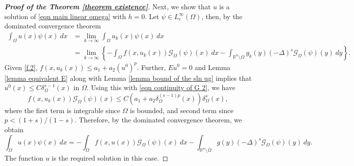 \documentclass{amsart}
\newcommand{\R}{\mathbb{R}}
\newcommand{\slap}{(-\Delta)^{s}}
\newcommand{\g}[1]{\mathcal{G}_{#1}}
\begin{document}
\begin{proof}[\textbf{Proof of the Theorem \ref{theorem existence}}]
    Next, we show that $u$ is a solution of \eqref{eqn main linear omega} with $h=0$.
    Let $\psi\in L^{\infty}_{c}(\Omega)$, then, by the dominated convergence theorem 
    \begin{equation*}
        \begin{split}
            \int_{\Omega}u(x)\psi(x)\ dx
            &=\lim_{k\to \infty}\int_{\Omega}u_{k}(x)\psi(x)\ dx \\
           & =\lim_{k\to\infty}\left\{-\int_{\Omega}f\left(x,u_{k}(x)\right)\g{\Omega}(\psi)(x)\ dx-\int_{\R^{n}\setminus\overline{\Omega}}g_{k}(y) \slap \g{\Omega}(\psi)(y)\ dy\right\}.
        \end{split}
    \end{equation*}
    Given \ref{f.2}, $f(x,u_{k}(x))\leq a_{1}+a_{2}(u^{0})^{p}$. Further, $Eu^{0}=0$ and Lemma \ref{lemma equivalent E} along with Lemma \ref{lemma bound of the sln ug} implies that $u^{0}(x)\leq C \delta_{\Omega}^{s-1}(x)$ in $\Omega$. Using this with \eqref{eqn continuity of G 2}, we have 
    \begin{equation*}
        f(x,u_{k}(x))\g{\Omega}(\psi)(x)\leq C(a_{1}+a_{2}\delta_{\Omega}^{(s-1)p}(x))\delta^{s}_{\Omega}(x),
    \end{equation*}
    where the first term is integrable since $\Omega$ is bounded, and second term since $p<(1+s)/(1-s)$. Therefore, by the dominated convergence theorem, we obtain
    \begin{equation*}
         \int_{\Omega}u(x)\psi(x)\ dx= -\int_{\Omega}f\left(x,u(x)\right) \g{\Omega}(\psi)(x)\ dx -\int_{\R^{n}\setminus\overline{\Omega}}g(y) \slap \g{\Omega}(\psi)(y)\ dy.
    \end{equation*}
      The function $u$ is the required solution in this case.
\smallskip 


\end{proof}
\end{document}
